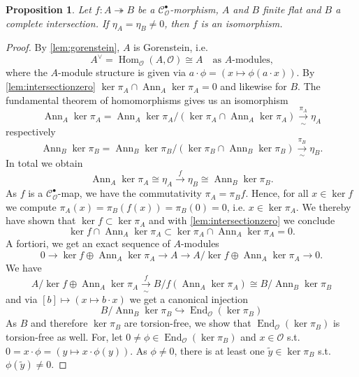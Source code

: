 \documentclass{article}
\theoremstyle{plain}%
\newtheorem{proposition}{Proposition}[section]
\theoremstyle{definition}
\theoremstyle{remark}
\newcommand{\cob}{\mathcal{C}_\mathcal{O}^\bullet}
\newcommand{\ann}{\operatorname{Ann}}
\renewcommand{\hom}{\operatorname{Hom}}
\begin{document}
\begin{proposition}\cite[theorem 5.24]{darmon1995fermat}\label{prop:eta_iso}
    Let \(f\colon A \twoheadrightarrow B\) be a \(\cob\)-morphism, \(A\) and \(B\) finite flat and \(B\) a 
    complete intersection. If \(\eta_A = \eta_B \neq 0\), then \(f\) is an isomorphism.
\end{proposition}
\begin{proof}
    By \cref{lem:gorenstein}, \(A\) is Gorenstein, i.e.
    \[
        A^\vee = \hom_\mathcal{O}(A, \mathcal{O}) \cong A \quad \text{as \(A\)-modules,} 
    \]
    where the \(A\)-module structure is given via \(a \cdot \phi = (x \mapsto \phi(a\cdot x))\).
    By \cref{lem:intersectionzero} \(\ker \pi_A \cap \ann_A \ker \pi_A = 0\) and likewise for \(B\).
    The fundamental theorem of homomorphisms gives us an isomorphism
    \[
        \ann_A \ker \pi_A = \ann_A \ker \pi_A/(\ker \pi_A \cap \ann_A \ker \pi_A) \xrightarrow[\sim]{\pi_A} \eta_A
    \]
    respectively
    \[
        \ann_B \ker \pi_B = \ann_B \ker \pi_B/(\ker \pi_B\cap \ann_B \ker \pi_B) \xrightarrow[\sim]{\pi_B} \eta_B.
    \]
    In total we obtain
    \[
        \ann_A \ker \pi_A \cong \eta_A \xrightarrow{f} \eta_B \cong \ann_B \ker \pi_B.  
    \]
    As \(f\) is a \(\cob\)-map, we have the commutativity \(\pi_A = \pi_Bf\). Hence, for all \(x\in \ker f\)
    we compute \(\pi_A(x) = \pi_B(f(x)) = \pi_B(0) = 0\), i.e. \(x \in \ker \pi_A\). We thereby have shown 
    that \(\ker f \subset \ker \pi_A\) and with \cref{lem:intersectionzero} we conclude
    \[
        \ker f \cap \ann_A \ker \pi_A \subset \ker \pi_A \cap \ann_A \ker \pi_A = 0.
    \]
    A fortiori, we get an exact sequence of \(A\)-modules
    \[
        0 \longrightarrow \ker f \oplus \ann_A \ker \pi_A \longrightarrow A 
        \longrightarrow A/\ker f \oplus \ann_A \ker \pi_A  \longrightarrow 0.
        \tag{\textasteriskcentered} \label{eq:ses}
    \]
    We have
    \[
        A/\ker f \oplus \ann_A \ker \pi_A \xrightarrow[\sim]{f} B/f(\ann_A \ker \pi_A) \cong B/\ann_B \ker \pi_B
    \]
    and via \([b] \mapsto (x \mapsto b\cdot x)\) we get a canonical injection
    \[
        B/\ann_B \ker \pi_B \hookrightarrow \operatorname{End}_\mathcal{O}(\ker \pi_B) 
    \]
    As \(B\) and therefore \(\ker \pi_B\) are torsion-free, we show that \(\operatorname{End}_\mathcal{O}(\ker \pi_B)\)
    is torsion-free as well. For, let \(0 \neq \phi \in \operatorname{End}_\mathcal{O}(\ker \pi_B)\) and 
    \(x \in \mathcal{O}\) s.t. \(0 = x \cdot \phi = (y \mapsto x \cdot \phi(y))\).
    As \(\phi \neq 0\), there is at least one \(\tilde y \in \ker \pi_B\) s.t. \(\phi(\tilde y) \neq 0\).

\end{proof}
\end{document}
